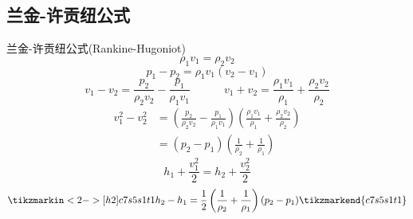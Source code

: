 \subsection{兰金-许贡纽公式}
\begin{frame}{兰金-许贡纽公式(Rankine-Hugoniot)}
  \vspace*{-1em}
  \begin{equation*}
    \rho_{1}v_{1}
    =
    \rho_{2}v_{2}
  \end{equation*}
  \begin{equation*}
    p_{1}-p_{2}
    =
    \rho_{1}v_{1}(v_{2}-v_{1})
  \end{equation*}
  \begin{equation*}
  v_{1}-v_{2}
  =
  \frac{p_{2}}{\rho_{2}v_{2}}
  -
  \frac{p_{1}}{\rho_{1}v_{1}}
  \quad\quad\quad
    v_{1}+v_{2}
    =
    \frac{\rho_{1}v_{1}}{\rho_{1}}
    +
    \frac{\rho_{2}v_{2}}{\rho_{2}}
  \end{equation*}
  \begin{equation*}
    \begin{aligned}
    v_{1}^{2}-v_{2}^{2}
    &=
    \left(
  \frac{p_{2}}{\rho_{2}v_{2}}
  -
  \frac{p_{1}}{\rho_{1}v_{1}}
    \right)
    \left(
    \frac{\rho_{1}v_{1}}{\rho_{1}}
    +
    \frac{\rho_{2}v_{2}}{\rho_{2}}
    \right)
    \\
    &=
    (p_{2}-p_{1})
    \left(\frac{1}{\rho_{2}}+\frac{1}{\rho_{1}}\right)
    \end{aligned}
  \end{equation*}
  \begin{equation*}
    h_{1}
    +
    \frac{v_{1}^{2}}{2}
    =
    h_{2}
    +
    \frac{v_{2}^{2}}{2}
  \end{equation*}
  \begin{equation*}
    \tikzmarkin<2->[h2]{c7s5s1t1}
    h_{2}-h_{1}
    =
    \frac{1}{2}\left(\frac{1}{\rho_{2}}+\frac{1}{\rho_{1}}\right)
    (p_{2}-p_{1})
    \tikzmarkend{c7s5s1t1}
  \end{equation*}
\end{frame}

